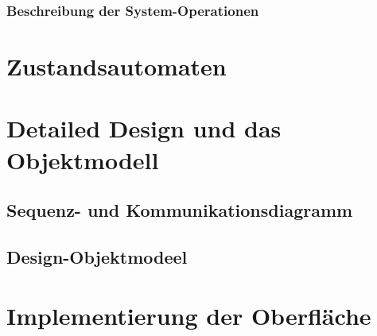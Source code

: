 \subsubsection{Beschreibung der System-Operationen}

\section{Zustandsautomaten}

\section{Detailed Design und das Objektmodell}

\subsection{Sequenz- und Kommunikationsdiagramm}

\subsection{Design-Objektmodeel}

\section{Implementierung der Oberfläche}
